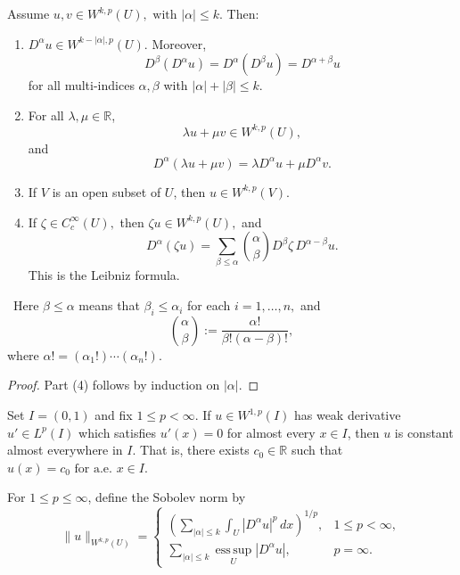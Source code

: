 \begin{theorem}
Assume
$
u,v\in W^{k,p}(U),
\text{ with }
|\alpha|\le k.
$
Then:
\begin{enumerate}
    \item
    $
    D^\alpha u\in W^{k-|\alpha|,p}(U).
    $
    Moreover,
    $$
    D^\beta(D^\alpha u)
    =
    D^\alpha(D^\beta u)
    =
    D^{\alpha+\beta}u
    $$
    for all multi-indices $\alpha,\beta$ with
    $
    |\alpha|+|\beta|\le k.
    $

    \item For all $\lambda,\mu\in \mathbb{R}$,
    $$
    \lambda u+\mu v\in W^{k,p}(U),
    $$
    and
    $$
    D^\alpha(\lambda u+\mu v)
    =
    \lambda D^\alpha u+\mu D^\alpha v.
    $$

    \item If $V$ is an open subset of $U$, then
    $
    u\in W^{k,p}(V).
    $

    \item If
    $
    \zeta\in C_c^\infty(U),
    $
    then
    $
    \zeta u\in W^{k,p}(U),
    $
    and
    $$
    D^\alpha(\zeta u)
    =
    \sum_{\beta\le \alpha}
    \binom{\alpha}{\beta}
    D^\beta \zeta\,
    D^{\alpha-\beta}u.
    $$
    This is the Leibniz formula.
\end{enumerate}
\end{theorem}

\begin{remark}\
    Here
    $
    \beta\le \alpha
    $
    means that
    $
    \beta_i\le \alpha_i
    $
    for each
    $
    i=1,\ldots,n,
    $
    and
    $$
    \binom{\alpha}{\beta}
    :=
    \frac{\alpha!}{\beta!(\alpha-\beta)!},
    $$
    where
    $
    \alpha!=(\alpha_1!)\cdots(\alpha_n!).
    $
\end{remark}


\begin{proof}
Part (4) follows by induction on $|\alpha|$.
\end{proof}

\begin{claim}
Set
$
I=(0,1)
$
and fix
$
1\le p<\infty.
$
If
$
u\in W^{1,p}(I)
$
has weak derivative
$
u'\in L^p(I)
$
which satisfies
$
u'(x)=0
$
for almost every $x\in I$, then $u$ is constant almost everywhere in $I$.
That is, there exists
$
c_0\in \mathbb{R}
$
such that
$
u(x)=c_0
\text{ for a.e. } x\in I.
$
\end{claim}


\begin{definition}
    For $1\le p\le \infty$, define the Sobolev norm by
    $$
    \|u\|_{W^{k,p}(U)}
    =
    \begin{cases}
    \left(
    \displaystyle\sum_{|\alpha|\le k}
    \int_U |D^\alpha u|^p\,dx
    \right)^{1/p},
    & 1\le p<\infty,\\[1.2em]
    \displaystyle\sum_{|\alpha|\le k}
    \operatorname*{ess\,sup}_{U}|D^\alpha u|,
    & p=\infty.
    \end{cases}
    $$
    \end{definition}
    
